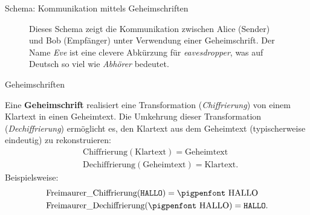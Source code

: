 \begin{frame}{Schema: Kommunikation mittels Geheimschriften}
\begin{figure}[H]
    \centering
    \caption{Dieses Schema zeigt die Kommunikation zwischen Alice (Sender) und Bob (Empfänger) unter Verwendung einer Geheimschrift. Der Name \emph{Eve} ist eine clevere Abkürzung für \emph{eavesdropper}, was auf Deutsch so viel wie \emph{Abhörer} bedeutet.}
    \label{fig:schemaGeheimschrift}
\end{figure}
\end{frame}


\begin{frame}{Geheimschriften}
    \begin{mydefinition}[Geheimschrift]\label{mydefinition:geheimschrift}
    Eine \textbf{Geheimschrift} realisiert eine Transformation (\emph{Chiffrierung}) von einem Klartext in einen Geheimtext. 
    Die Umkehrung dieser Transformation (\emph{Dechiffrierung}) ermöglicht es, den Klartext aus dem Geheimtext (typischerweise eindeutig) zu rekonstruieren:
    \begin{align*}
        &\text{Chiffrierung}(\text{Klartext}) = \text{Geheimtext} \\
        &\text{Dechiffrierung}(\text{Geheimtext}) = \text{Klartext}.
    \end{align*}
    Beispielsweise:
    \begin{align*}
        &\text{Freimaurer\_Chiffrierung}(\texttt{HALLO}) = \text{\pigpenfont HALLO} \\
        &\text{Freimaurer\_Dechiffrierung}(\text{\pigpenfont HALLO}) = \texttt{HALLO}.
    \end{align*}
    \end{mydefinition}
\end{frame}


